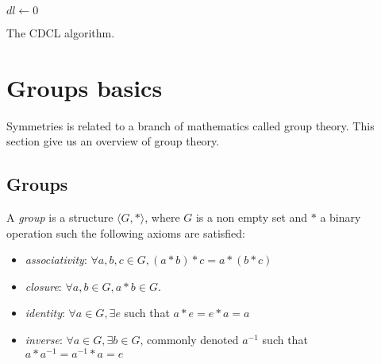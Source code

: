 \begin{algorithm}
	{
		$dl \gets 0$ 
		\Return \true
	}
	\caption{The CDCL algorithm.}
	\label{algo:cdcl}
	
\end{algorithm}



\clearpage
\section{Groups basics}

Symmetries is related to a branch of mathematics called group theory. This section give us an overview of group
theory.

\subsection{Groups}

A \emph{group} is a structure $\langle G, * \rangle$, where $G$ is a non empty set and $*$ a binary
operation such the following axioms are satisfied:
\begin{itemize}[noitemsep,nolistsep]
	\item \emph{associativity}: $\forall a, b, c \in G, (a * b) * c = a * (b * c)$
	\item \emph{closure}: $\forall a, b \in G, a * b \in G$.
	\item \emph{identity}: $\forall a \in G, \exists e$ such that $ a * e = e * a = a$
	\item \emph{inverse}:  $\forall a \in G, \exists b \in G$, commonly denoted $a^{-1}$ such that
	 $a * a^{-1} = a^{-1} * a = e$
\end{itemize}

